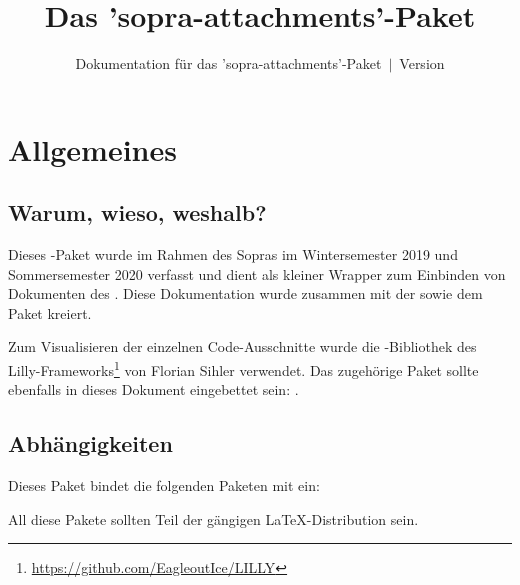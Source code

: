 \documentclass{sopra-base}
\title{Das 'sopra-attachments'-Paket}
\subtitle[Dokumentation für das 'sopra-attachments'-Paket]{Dokumentation für das 'sopra-attachments'-Paket~$\mid$~Version \thesoaversion}
\begin{document}
    \maketitle%
%
%

%
%
%
%

\section{Allgemeines}
\subsection{Warum, wieso, weshalb?}
    Dieses \LaTeXe-Paket wurde im Rahmen des Sopras im 
    Wintersemester 2019 und Sommersemester 2020 verfasst und dient als
    kleiner Wrapper zum Einbinden von Dokumenten
    des . Diese Dokumentation wurde zusammen mit der 
     sowie dem Paket  kreiert.\par
    Zum Visualisieren der einzelnen Code-Ausschnitte wurde die 
    -Bibliothek des Lilly-Frameworks\footnote{\url{https://github.com/EagleoutIce/LILLY}} von
    Florian Sihler verwendet.
    Das zugehörige Paket sollte ebenfalls in dieses Dokument eingebettet sein: .
\subsection{Abhängigkeiten}
    Dieses Paket bindet die folgenden Paketen mit ein:
    \begin{multicols}{3}
    \end{multicols}
    All diese Pakete sollten Teil der gängigen \LaTeX-Distribution sein.
\end{document}
